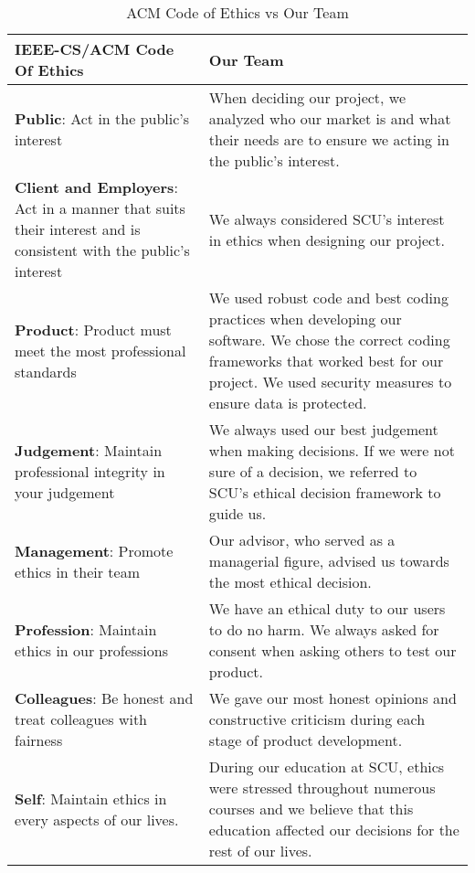  \begin{center}
 \begin{table}[ht]
 \caption{ACM Code of Ethics vs Our Team}\label{ethicsAnalysis}
 \begin{tabularx}{\textwidth}{|X|X|} 
 \hline
  \textbf{IEEE-CS/ACM Code Of Ethics} & \textbf{Our Team}  \\ 
 \hline
 \textbf{Public}: Act in the public's interest & When deciding our project, we analyzed who our market is and what their needs are to ensure we acting in the public’s interest. \\ 
 \hline
 \textbf{Client and Employers}: Act in a manner that suits their interest and is consistent with the public’s interest & We always considered SCU’s interest in ethics when designing our project.  \\
 \hline
 \textbf{Product}: Product must meet the most professional standards & We used robust code and best coding practices when developing our software. We chose the correct coding frameworks that worked best for our project. We used security measures to ensure data is protected. \\
 \hline
 \textbf{Judgement}: Maintain professional integrity in your judgement & We always used our best judgement when making decisions. If we were not sure of a decision, we referred to SCU’s ethical decision framework to guide us. \\
 \hline
 \textbf{Management}: Promote ethics in their team  & Our advisor, who served as a managerial figure, advised us towards the most ethical decision. \\
 \hline
 \textbf{Profession}: Maintain ethics in our professions & We have an ethical duty to our users to do no harm. We always asked for consent when asking others to test our product. \\
 \hline
 \textbf{Colleagues}: Be honest and treat colleagues with fairness & We gave our most honest opinions and constructive criticism during each stage of product development. \\
 \hline
 \textbf{Self}: Maintain ethics in every aspects of our lives. & During our education at SCU, ethics were stressed throughout numerous courses and we believe that this education affected our decisions for the rest of our lives. \\
 \hline
\end{tabularx}
\end{table}
\end{center}

